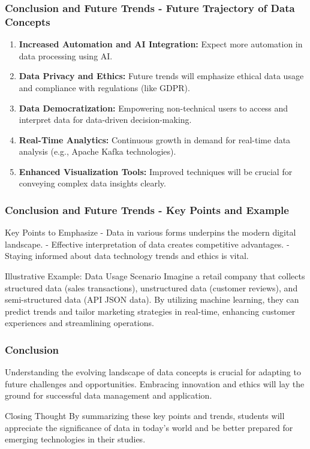 \documentclass{beamer}
\begin{document}
\begin{frame}[fragile]
    \frametitle{Conclusion and Future Trends - Future Trajectory of Data Concepts}
    \begin{enumerate}
        \item \textbf{Increased Automation and AI Integration:}
        Expect more automation in data processing using AI.
        
        \item \textbf{Data Privacy and Ethics:}
        Future trends will emphasize ethical data usage and compliance with regulations (like GDPR).
        
        \item \textbf{Data Democratization:}
        Empowering non-technical users to access and interpret data for data-driven decision-making.
        
        \item \textbf{Real-Time Analytics:}
        Continuous growth in demand for real-time data analysis (e.g., Apache Kafka technologies).
        
        \item \textbf{Enhanced Visualization Tools:}
        Improved techniques will be crucial for conveying complex data insights clearly.
    \end{enumerate}
\end{frame}

\begin{frame}[fragile]
    \frametitle{Conclusion and Future Trends - Key Points and Example}
    \begin{block}{Key Points to Emphasize}
        - Data in various forms underpins the modern digital landscape.
        - Effective interpretation of data creates competitive advantages.
        - Staying informed about data technology trends and ethics is vital.
    \end{block}

    \begin{block}{Illustrative Example: Data Usage Scenario}
        Imagine a retail company that collects structured data (sales transactions), 
        unstructured data (customer reviews), and semi-structured data (API JSON data). 
        By utilizing machine learning, they can predict trends and tailor marketing strategies 
        in real-time, enhancing customer experiences and streamlining operations.
    \end{block}
\end{frame}

\begin{frame}[fragile]
    \frametitle{Conclusion}
    Understanding the evolving landscape of data concepts is crucial for adapting to 
    future challenges and opportunities. Embracing innovation and ethics will lay the ground 
    for successful data management and application.
    
    \begin{block}{Closing Thought}
        By summarizing these key points and trends, students will appreciate the significance 
        of data in today's world and be better prepared for emerging technologies in their studies.
    \end{block}
\end{frame}
\end{document}
